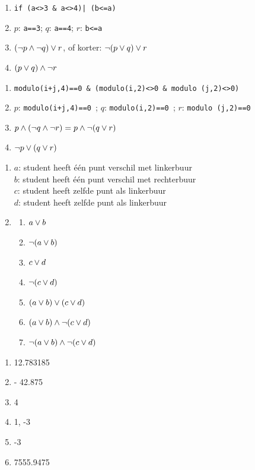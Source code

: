 \begin{Oplossing}{7.8}
\begin{enumerate}
\item \verb+if (a<>3 & a<>4)| (b<=a)+
\item $p$: \texttt{a==3}; $q$: \texttt{a==4}; $r$: \texttt{b<=a}
\item $(\neg p \wedge \neg q)\vee r$, of korter: $\neg(p \vee q) \vee r$
\item $(p\vee q)\wedge \neg r$
\end{enumerate}
\end{Oplossing}
\begin{Oplossing}{7.9}
\begin{enumerate}
\item \verb/modulo(i+j,4)==0 & (modulo(i,2)<>0 & modulo (j,2)<>0)/
\item $p$: \verb/modulo(i+j,4)==0 /; $q$: \verb/modulo(i,2)==0 /; $r$: \verb/modulo (j,2)==0/
\item $p \wedge (\neg q \wedge \neg r)=p\wedge \neg (q \vee r)$
\item $\neg p \vee (q \vee r)$
\end{enumerate}
\end{Oplossing}
\begin{Oplossing}{7.14}
\begin{enumerate}
\item
$a$: student heeft één punt verschil met linkerbuur\\
$b$: student heeft één punt verschil met rechterbuur\\
$c$: student heeft zelfde punt als linkerbuur\\
$d$: student heeft zelfde punt  als linkerbuur
\item \begin{enumerate}
\item $a \vee b$
\item $\neg (a \vee b)$
\item $c \vee d$
\item $\neg (c \vee d) $
\item $(a\vee b)\vee (c\vee d)$
\item $(a\vee b)\wedge \neg (c\vee d)$
\item $\neg (a\vee b)\wedge \neg (c\vee d)$
\end{enumerate}
\end{enumerate}
\end{Oplossing}
\begin{Oplossing}{9.1}
\begin{enumerate}
\item  12.783185
\item - 42.875
\item 4
\item 1, -3
\item -3
\item 7555.9475
\end{enumerate}
   
\end{Oplossing}
